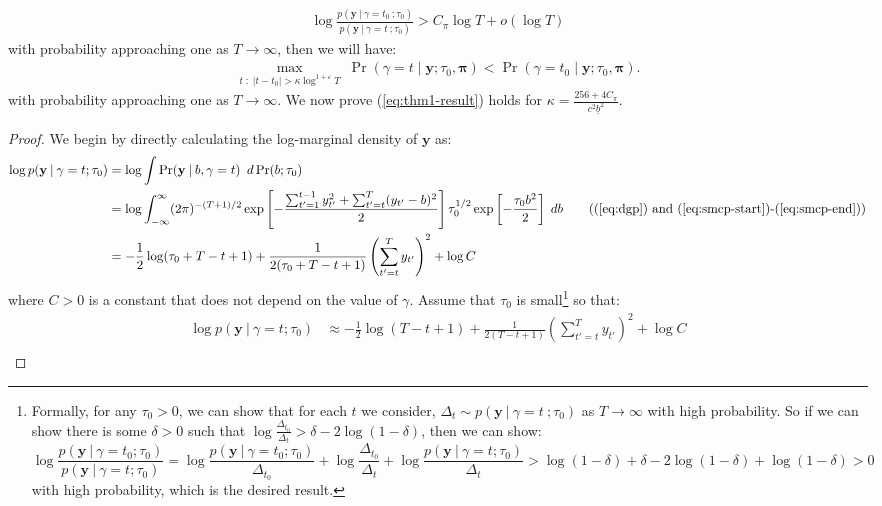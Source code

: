 \begin{align}
    \log \frac{p(\mathbf{y} \:|\:\gamma = t_0 \:; \tau_0)}{p(\mathbf{y} \:|\:\gamma = t \:; \tau_0)} > C_\pi \log T + o(\log T) \label{eq:thm1-result}
\end{align}
with probability approaching one as $T \to \infty$, then we will have:
\begin{align*}
    \max_{t \;:\; |t - t_0| > \kappa \log^{1+\varepsilon} T} \; \Pr(\gamma = t  \;|\; \mathbf{y} ; \tau_0,\boldsymbol{\pi}) < \Pr(\gamma = t_0  \;|\; \mathbf{y} ; \tau_0,\boldsymbol{\pi}).
\end{align*}
with probability approaching one as $T \to \infty$. We now prove (\ref{eq:thm1-result}) holds for $\kappa = \frac{256 + 4C_\pi}{c^2\underline{b}^2}$.

\begin{proof}
We begin by directly calculating the log-marginal density of $\mathbf{y}$ as: 
\begin{align*}
    \log p(\mathbf{y} \:|\:\gamma = t ; \tau_0) &= \log \int \Pr(\mathbf{y} \:|\:b,\gamma = t) \:\; d\Pr(b;\tau_0) \\
    &= \log \int_{-\infty}^\infty (2\pi)^{-(T+1)/2} \exp\left[-\frac{\sum_{t'=1}^{t-1} y_{t'}^2 + \sum_{t'=t}^{T} (y_{t'} - b)^2}{2}\right] \tau_0^{1/2}\exp\left[-\frac{\tau_0 b^2}{2}\right] \; db \tag{(\ref{eq:dgp}) and (\ref{eq:smcp-start})-(\ref{eq:smcp-end})} \\
    &= -\frac{1}{2}\log(\tau_0 + T - t + 1) + \frac{1}{2(\tau_0 + T-t+1)}\left(\sum_{t'=t}^{T} y_{t'}\right)^2 + \log C
\end{align*}
where $C>0$ is a constant that does not depend on the value of $\gamma$. Assume that $\tau_0$ is small\footnote{Formally, for any $\tau_0 >0$, we can show that for each $t$ we consider, $\Delta_t \sim p(\mathbf{y} \:|\:\gamma = t \:; \tau_0)$ as $T \to \infty$ with high probability. So if we can show there is some $\delta > 0$ such that $\log \frac{\Delta_{t_0}}{\Delta_t} > \delta-2\log(1-\delta)$, then we can show: $$\log \frac{p(\mathbf{y} \:|\:\gamma = t_0 ; \tau_0)}{p(\mathbf{y} \:|\:\gamma = t ; \tau_0)} = \log\frac{p(\mathbf{y} \:|\:\gamma = t_0 ; \tau_0)}{\Delta_{t_0}} + \log \frac{\Delta_{t_0}}{\Delta_t} + \log \frac{p(\mathbf{y} \:|\:\gamma = t ; \tau_0)}{\Delta_t} > \log(1-\delta) + \delta-2\log(1-\delta) +\log(1-\delta) > 0$$ with high probability, which is the desired result.} so that: 
\begin{align*}
    \log p(\mathbf{y} \:|\: \gamma = t; \tau_0) &\approx -\frac{1}{2}\log(T - t + 1) + \frac{1}{2(T-t+1)}\left(\sum_{t'=t}^{T} y_{t'}\right)^2 + \log C \\

\end{align*}
\end{proof}
